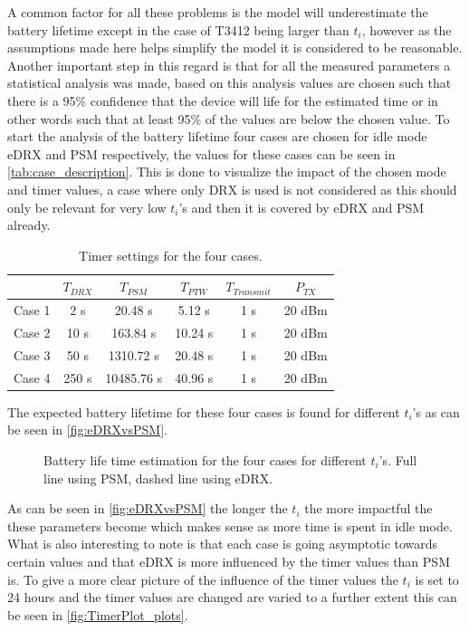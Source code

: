 A common factor for all these problems is the model will underestimate the battery lifetime except in the case of T3412 being larger than $t_i$, however as the assumptions made here helps simplify the model it is considered to be reasonable. Another important step in this regard is that for all the measured parameters a statistical analysis was made, based on this analysis values are chosen such that there is a 95\% confidence that the device will life for the estimated time or in other words such that at least 95\% of the values are below the chosen value. To start the analysis of the battery lifetime four cases are chosen for idle mode eDRX and PSM respectively, the values for these cases can be seen in \autoref{tab:case_description}. This is done to visualize the impact of the chosen mode and timer values, a case where only DRX is used is not considered as this should only be relevant for very low $t_i$'s and then it is covered by eDRX and PSM already.

\begin{table}[H]
\centering
\begin{tabular}{|c|c|c|c|c|c|} \hline
		& $T_{DRX}$	& $T_{PSM}$	& $T_{PTW}$	& $T_{Transmit}$	& $P_{TX}$ 	\\ \hline
Case 1	& 2 s 		& 20.48 s	& 5.12 s	& 1 s				& 20 dBm	\\ \hline
Case 2	& 10 s		& 163.84 s	& 10.24 s	& 1 s				& 20 dBm	\\ \hline
Case 3	& 50 s		& 1310.72 s	& 20.48 s	& 1 s				& 20 dBm	\\ \hline
Case 4	& 250 s		& 10485.76 s& 40.96 s	& 1 s				& 20 dBm	\\ \hline
\end{tabular}
\caption{Timer settings for the four cases.}
\label{tab:case_description}
\end{table}

The expected battery lifetime for these four cases is found for different $t_i$'s as can be seen in \autoref{fig:eDRXvsPSM}.

\begin{figure}[H]
\centering
{}
\resizebox{0.7\textwidth}{!}{
}
\caption{Battery life time estimation for the four cases for different $t_i$'s. Full line using PSM, dashed line using eDRX.}
\label{fig:eDRXvsPSM}
\end{figure}

As can be seen in \autoref{fig:eDRXvsPSM} the longer the $t_i$ the more impactful the these parameters become which makes sense as more time is spent in idle mode. What is also interesting to note is that each case is going asymptotic towards certain values and that eDRX is more influenced by the timer values than PSM is. To give a more clear picture of the influence of the timer values the $t_i$ is set to 24 hours and the timer values are changed are varied to a further extent this can be seen in \autoref{fig:TimerPlot_plots}.


